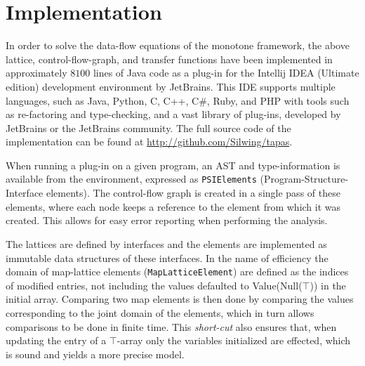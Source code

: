 \section{Implementation}
\label{sec:worklist}
In order to solve the data-flow equations of the monotone framework, the above lattice, control-flow-graph, and transfer functions have been implemented in approximately $8100$ lines of Java code as a plug-in for the Intellij IDEA (Ultimate edition) development environment by JetBrains. This IDE supports multiple languages, such as Java, Python, C, C++, C\#, Ruby, and PHP with tools such as re-factoring and type-checking, and a vast library of plug-ins, developed by JetBrains or the JetBrains community. The full source code of the implementation can be found at \url{http://github.com/Silwing/tapas}.

When running a plug-in on a given program, an AST and type-information is available from the environment, expressed as \texttt{PSIElements} (Program-Structure-Interface elements).  The control-flow graph is created in a single pass of these elements, where each node keeps a reference to the element from which it was created. This allows for easy error reporting when performing the analysis. 

The lattices are defined by interfaces and the elements are implemented as immutable data structures of these interfaces. In the name of efficiency the domain of map-lattice elements (\texttt{MapLatticeElement}) are defined as the indices of modified entries, not including the values defaulted to Value(Null($\top$)) in the initial array. Comparing two map elements is then done by comparing the values corresponding to the joint domain of the elements, which in turn allows comparisons to be done in finite time. This \emph{short-cut} also ensures that, when updating the entry of a $\top$-array only the variables initialized are effected, which is sound and yields a more precise model.

